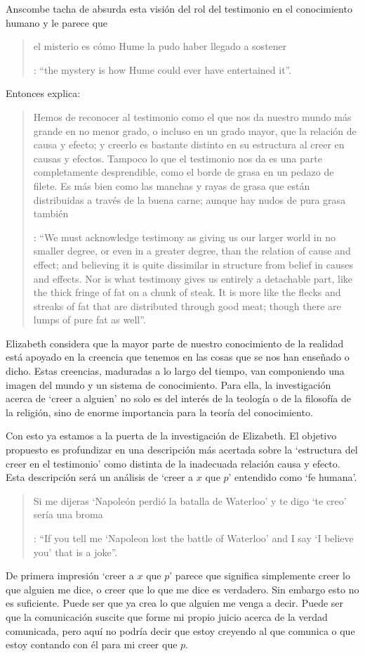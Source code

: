 Anscombe tacha de absurda esta visión del rol del testimonio en el conocimiento humano y le parece que \blockquote[{\Cite[Cf.][3]{anscombe2008faith:tobelieve}}: \enquote{the mystery is how Hume could ever have entertained it}.]{el misterio es cómo Hume la pudo haber llegado a sostener}. Entonces explica: \blockquote[{\Cite[3]{anscombe2008faith:tobelieve}}: \enquote{We must acknowledge testimony as giving us our larger world in no smaller degree, or even in a greater degree, than the relation of cause and effect; and believing it is quite dissimilar in structure from belief in causes and effects. Nor is what testimony gives us entirely a detachable part, like the thick fringe of fat on a chunk of steak. It is more like the flecks and streaks of fat that are distributed through good meat; though there are lumps of pure fat as well}.]{Hemos de reconocer al testimonio como el que nos da nuestro mundo más grande en no menor grado, o incluso en un grado mayor, que la relación de causa y efecto; y creerlo es bastante distinto en su estructura al creer en causas y efectos. Tampoco lo que el testimonio nos da es una parte completamente desprendible, como el borde de grasa en un pedazo de filete. Es más bien como las manchas y rayas de grasa que están distribuidas a través de la buena carne; aunque hay nudos de pura grasa también} Elizabeth considera que la mayor parte de nuestro conocimiento de la realidad está apoyado en la creencia que tenemos en las cosas que se nos han enseñado o dicho. Estas creencias, maduradas a lo largo del tiempo, van componiendo una imagen del mundo y un sistema de conocimiento. Para ella, la investigación acerca de `creer a alguien' no solo es del interés de la teología o de la filosofía de la religión, sino de enorme importancia para la teoría del conocimiento.

Con esto ya estamos a la puerta de la investigación de Elizabeth. El objetivo propuesto es profundizar en una descripción más acertada sobre la `estructura del creer en el testimonio' como distinta de la inadecuada relación causa y efecto. Esta descripción será un análisis de \enquote*{creer a $x$ que $p$} entendido como `fe humana'.

\label{subsec:presups}
\blockquote[{\Cite[4]{anscombe2008faith:tobelieve}}: \enquote{If you tell me `Napoleon lost the battle of Waterloo' and I say `I believe you' that is a joke}.]{Si me dijeras `Napoleón perdió la batalla de Waterloo' y te digo `te creo' sería una broma}. De primera impresión \enquote*{creer a $x$ que $p$} parece que significa simplemente creer lo que alguien me dice, o creer que lo que me dice es verdadero. Sin embargo esto no es suficiente. Puede ser que ya crea lo que alguien me venga a decir. Puede ser que la comunicación suscite que forme mi propio juicio acerca de la verdad comunicada, pero aquí no podría decir que estoy creyendo al que comunica o que estoy contando con él para mi creer que $p$.

